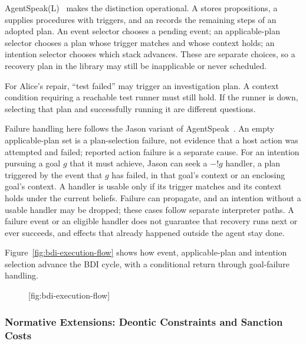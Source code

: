 AgentSpeak(L)~ makes the distinction operational.
A  stores propositions, a  supplies
procedures with triggers, and an  records the remaining
steps of an adopted plan. An event selector chooses a pending event; an
applicable-plan selector chooses a plan whose trigger matches and whose context
holds; an intention selector chooses which stack advances. These are separate
choices, so a recovery plan in the library may still be inapplicable or never
scheduled.

For Alice's repair, ``test failed'' may trigger an investigation plan. A context
condition requiring a reachable test runner must still hold. If the runner is
down, selecting that plan and successfully running it are different questions.


Failure handling here follows the Jason variant of AgentSpeak~.
An empty applicable-plan set is a plan-selection failure, not evidence that a
host action was attempted and failed; reported action failure is a separate cause.
For an intention pursuing a goal $g$ that it must achieve, Jason can seek a
$-!g$ handler, a plan triggered by the event that $g$ has failed, in that
goal's context or an enclosing goal's context. A handler
is usable only if its trigger matches and its context holds under the current
beliefs. Failure can propagate, and an intention without a usable handler may be
dropped; these cases follow separate interpreter paths. A failure event or an
eligible handler does not guarantee that recovery runs next or ever succeeds,
and effects that already happened outside the agent stay done.

Figure~\ref{fig:bdi-execution-flow} shows how event, applicable-plan and intention
selection advance the BDI cycle, with a conditional return through goal-failure handling.

\begin{figure}[tp]
  \centering
  [fig:bdi-execution-flow]
\end{figure}

\subsubsection{Normative Extensions: Deontic Constraints and Sanction Costs}

